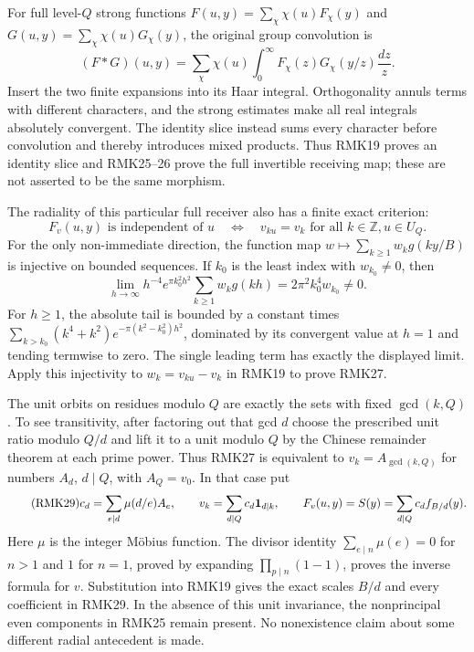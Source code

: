 \documentclass[11pt]{article}
\begin{document}
For full level-$Q$ strong functions
$F(u,y)=\sum_\chi\chi(u)F_\chi(y)$ and
$G(u,y)=\sum_\chi\chi(u)G_\chi(y)$, the original group convolution is
\begin{equation}\tag{RMK26}
 (F*G)(u,y)=\sum_\chi\chi(u)
       \int_0^\infty F_\chi(z)G_\chi(y/z)\frac{dz}{z}.
\end{equation}
Insert the two finite expansions into its Haar integral. Orthogonality
annuls terms with different characters, and the strong estimates
make all real integrals absolutely convergent. The identity slice
instead sums every character before convolution and thereby introduces
mixed products. Thus RMK19 proves an identity slice and RMK25--26
prove the full invertible receiving map; these are not asserted to
be the same morphism.

The radiality of this particular full receiver also has a finite
exact criterion:
\begin{equation}\tag{RMK27}
 F_v(u,y)\text{ is independent of }u
 \quad\Longleftrightarrow\quad
 v_{ku}=v_k\text{ for all }k\in\mathbb Z, u\in U_Q.
\end{equation}
For the only non-immediate direction, the function map
$w\mapsto\sum_{k\geq1}w_kg(ky/B)$ is injective on bounded
sequences. If $k_0$ is the least index with $w_{k_0}\ne0$, then
\begin{equation}\tag{RMK28}
 \lim_{h\to\infty}h^{-4}e^{\pi k_0^2h^2}
       \sum_{k\geq1}w_kg(kh)=2\pi^2 k_0^4w_{k_0}\ne0.
\end{equation}
For $h\geq1$, the absolute tail is bounded by a constant times
$\sum_{k>k_0}(k^4+k^2)e^{-\pi(k^2-k_0^2)h^2}$, dominated by
its convergent value at $h=1$ and tending termwise to zero. The
single leading term has exactly the displayed limit. Apply this
injectivity to $w_k=v_{ku}-v_k$ in RMK19 to prove RMK27.

The unit orbits on residues modulo $Q$ are exactly the sets with
fixed $\gcd(k,Q)$. To see transitivity, after factoring out that
gcd $d$ choose the prescribed unit ratio modulo $Q/d$ and lift it
to a unit modulo $Q$ by the Chinese remainder theorem at each
prime power. Thus RMK27 is equivalent to $v_k=A_{\gcd(k,Q)}$
for numbers $A_d$, $d\mid Q$, with $A_Q=v_0$. In that case put
\begin{equation}\tag{RMK29}
 c_d=\sum_{e\mid d}\mu(d/e)A_e,\qquad
 v_k=\sum_{d\mid Q}c_d{\bf1}_{d\mid k},\qquad
 F_v(u,y)=S(y)=\sum_{d\mid Q}c_d f_{B/d}(y).
\end{equation}
Here $\mu$ is the integer M\"obius function. The divisor identity
$\sum_{e\mid n}\mu(e)=0$ for $n>1$ and $1$ for $n=1$, proved by
expanding $\prod_{p\mid n}(1-1)$, proves the inverse formula for
$v$. Substitution into RMK19 gives the exact scales $B/d$ and
every coefficient in RMK29. In the absence of this unit invariance,
the nonprincipal even components in RMK25 remain present. No
nonexistence claim about some different radial antecedent is made.
\end{document}
